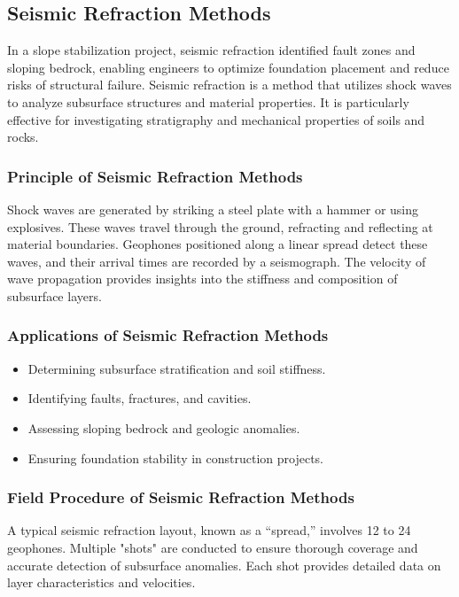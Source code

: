 \documentclass[12pt,a4paper]{report}
\begin{document}
\subsection{Seismic Refraction Methods}
In a slope stabilization project, seismic refraction identified fault zones and sloping bedrock, enabling engineers to optimize foundation placement and reduce risks of structural failure. Seismic refraction is a method that utilizes shock waves to analyze subsurface structures and material properties. It is particularly effective for investigating stratigraphy and mechanical properties of soils and rocks.

\subsubsection{Principle of Seismic Refraction Methods}
Shock waves are generated by striking a steel plate with a hammer or using explosives. These waves travel through the ground, refracting and reflecting at material boundaries. Geophones positioned along a linear spread detect these waves, and their arrival times are recorded by a seismograph. The velocity of wave propagation provides insights into the stiffness and composition of subsurface layers.

\subsubsection{Applications of Seismic Refraction Methods}
\begin{itemize}
    \item Determining subsurface stratification and soil stiffness.
    \item Identifying faults, fractures, and cavities.
    \item Assessing sloping bedrock and geologic anomalies.
    \item Ensuring foundation stability in construction projects.
\end{itemize}

\subsubsection{Field Procedure of Seismic Refraction Methods}
A typical seismic refraction layout, known as a “spread,” involves 12 to 24 geophones. Multiple "shots" are conducted to ensure thorough coverage and accurate detection of subsurface anomalies. Each shot provides detailed data on layer characteristics and velocities.
\end{document}
